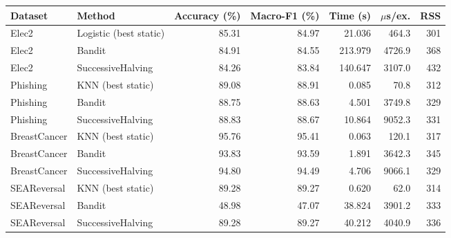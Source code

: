 \begin{tabular}{llrrrrr}
\toprule
Dataset & Method & Accuracy (\%) & Macro-F1 (\%) & Time (s) & $\mu$s/ex. & RSS \\
\midrule
Elec2 & Logistic (best static) & 85.31 & 84.97 & 21.036 & 464.3 & 301 \\
Elec2 & Bandit & 84.91 & 84.55 & 213.979 & 4726.9 & 368 \\
Elec2 & SuccessiveHalving & 84.26 & 83.84 & 140.647 & 3107.0 & 432 \\
Phishing & KNN (best static) & 89.08 & 88.91 & 0.085 & 70.8 & 312 \\
Phishing & Bandit & 88.75 & 88.63 & 4.501 & 3749.8 & 329 \\
Phishing & SuccessiveHalving & 88.83 & 88.67 & 10.864 & 9052.3 & 331 \\
BreastCancer & KNN (best static) & 95.76 & 95.41 & 0.063 & 120.1 & 317 \\
BreastCancer & Bandit & 93.83 & 93.59 & 1.891 & 3642.3 & 345 \\
BreastCancer & SuccessiveHalving & 94.80 & 94.49 & 4.706 & 9066.1 & 329 \\
SEAReversal & KNN (best static) & 89.28 & 89.27 & 0.620 & 62.0 & 314 \\
SEAReversal & Bandit & 48.98 & 47.07 & 38.824 & 3901.2 & 333 \\
SEAReversal & SuccessiveHalving & 89.28 & 89.27 & 40.212 & 4040.9 & 336 \\
\bottomrule
\end{tabular}
